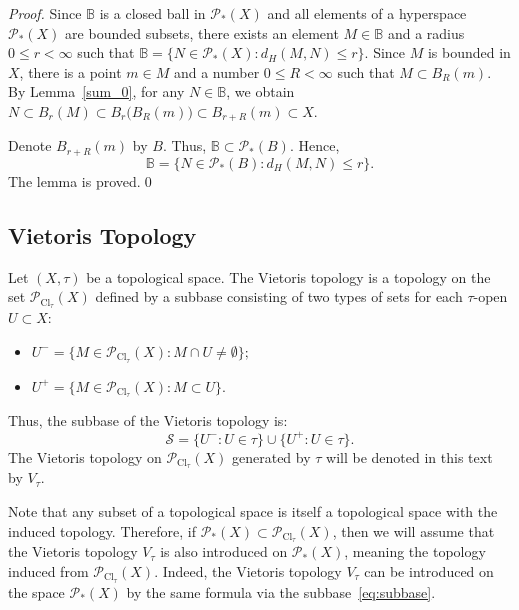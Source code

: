 \documentclass{svproc}
\def\Cl{\operatorname{Cl}}
\begin{document}
\begin{proof}

Since $\mathbb{B}$ is a closed ball in $\mathcal{P}_{*}(X)$ and all elements of a hyperspace $\mathcal{P}_{*}(X)$ are bounded subsets, there exists an element $M\in \mathbb{B}$ and a radius $0\le r < \infty$ such that $\mathbb{B} = \bigl\{N\in \mathcal{P}_{*}(X)\colon d_H(M, N) \le r\bigr\}$. Since $M$ is bounded in $X$, there is a point $m\in M$ and a number $0\le R < \infty$ such that $M\subset B_R(m)$. By Lemma~\ref{sum_0}, for any $N\in \mathbb{B}$, we obtain $N\subset B_r(M) \subset B_r\bigl(B_R(m)\bigr) \subset B_{r+R}(m)\subset X.$ 

Denote $B_{r+R}(m)$ by $B$. Thus, $\mathbb{B}\subset \mathcal{P}_{*}(B)$. Hence, 
$$\mathbb{B} = \bigl\{N\in \mathcal{P}_{*}(B)\colon d_H(M, N) \le r\bigr\}.$$
The lemma is proved.\qed

\end{proof}


\subsection{Vietoris Topology}\label{sec:Vietoris}

\begin{definition}
Let $(X, \tau)$ be a topological space. The Vietoris topology is a topology on the set $\mathcal{P}_{\Cl_{\tau}}(X)$ defined by a subbase consisting of two types of sets for each $\tau$-open $U \subset X:$
\begin{itemize}
\item $U^- = \bigl\{M \in \mathcal{P}_{\Cl_{\tau}}(X) \colon M \cap U \neq \emptyset\bigr\};$
\item $U^+ = \bigl\{M \in \mathcal{P}_{\Cl_{\tau}}(X) \colon M \subset U\bigr\}.$
\end{itemize}
Thus, the subbase of the Vietoris topology is$:$
\begin{equation}\label{eq:subbase}
\mathcal{S} = \{U^- \colon U \in \tau\} \cup \{U^+ \colon U \in \tau\}.
\end{equation}
The Vietoris topology on $\mathcal{P}_{\Cl_{\tau}}(X)$ generated by $\tau$ will be denoted in this text by $V_{\tau}$.
\end{definition}

Note that any subset of a topological space is itself a topological space with the induced topology. Therefore, if $\mathcal{P}_{*}(X)\subset \mathcal{P}_{\Cl_{\tau}}(X)$, then we will assume that the Vietoris topology $V_{\tau}$ is also introduced on $\mathcal{P}_{*}(X)$, meaning the topology induced from $\mathcal{P}_{\Cl_{\tau}}(X)$. Indeed, the Vietoris topology $V_{\tau}$ can be introduced on the space $\mathcal{P}_{*}(X)$ by the same formula via the subbase~\eqref{eq:subbase}.
\end{document}
